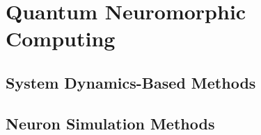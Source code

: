
\chapter{Quantum Neuromorphic Computing}
\section{System Dynamics-Based Methods}
\section{Neuron Simulation Methods}

